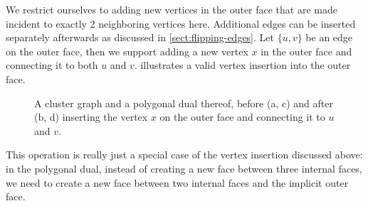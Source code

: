 We restrict ourselves to adding new vertices in the outer face that are made incident to exactly 2 neighboring vertices here.
Additional edges can be inserted separately afterwards as discussed in \cref{sect:flipping-edges}.
Let $\{u,v\}$ be an edge on the outer face, then we support adding a new vertex $x$ in the outer face and connecting it to both $u$ and $v$.
 illustrates a valid vertex insertion into the outer face.

\begin{figure}[H]
	\centering
	\quad
	\qquad
	\quad
	\caption{A cluster graph and a polygonal dual thereof, before (a, c) and after (b, d) inserting the vertex $x$ on the outer face and connecting it to $u$ and $v$.}
	\label{fig:insert-vertex-example-outside}
\end{figure}

This operation is really just a special case of the vertex insertion discussed above: in the polygonal dual, instead of creating a new face between three internal faces, we need to create a new face between two internal faces and the implicit outer face.

